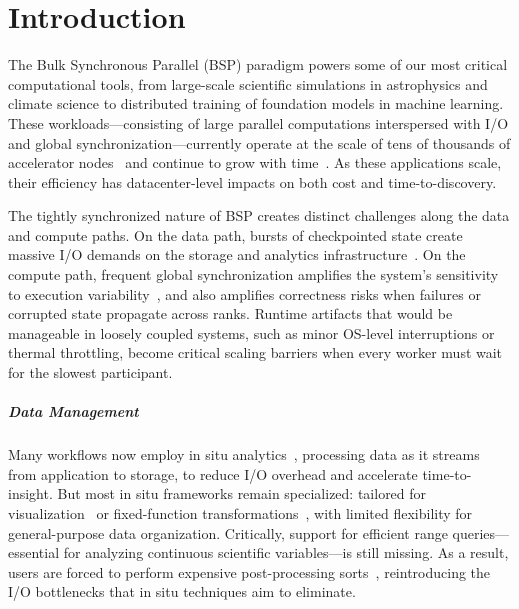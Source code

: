 
\chapter{Introduction}
\minitoc

The Bulk Synchronous Parallel (BSP) paradigm powers some of our most critical computational tools,
from large-scale scientific simulations in astrophysics and climate science to distributed training
of foundation models in machine learning.
These workloads---consisting of large parallel computations interspersed with I/O and global
synchronization---currently operate at the scale of tens of thousands of accelerator
nodes~\cite{Das2023:LargeScale,Stock2024:LargeScale,Gratt2024:Llama3Scale,:LlamaScale} and
continue to grow with time~\cite{Rahma2024:MLScale}.
As these applications scale, their efficiency has datacenter-level impacts on both cost and
time-to-discovery.

The tightly synchronized nature of BSP creates distinct challenges along the data and compute
paths.
On the data path, bursts of checkpointed state create massive I/O demands on the storage and
analytics
infrastructure~\cite{Jones2012:Checkpointing,Eisen2022:Checkpoint,Lian2025:UniversalCheckpointing}.
On the compute path, frequent global synchronization amplifies the system's sensitivity to
execution
variability~\cite{Hoefl2010:Noise,Petri2003:Missing,Yildi2016:IONoise,Kocol2018:Varbench,Acun2016:Variation},
and also amplifies correctness risks when failures or corrupted state propagate across ranks.
Runtime artifacts that would be manageable in loosely coupled systems, such as minor OS-level
interruptions or thermal throttling, become critical scaling barriers when every worker must wait
for the slowest participant.

\paragraph{Data Management}
Many workflows now employ in situ
analytics~\cite{Bauer2016:SituMethodsInfrastructures,Child2020:TerminologySituVisualization},
processing data as it streams from application to storage, to reduce I/O overhead and accelerate
time-to-insight.
But most in situ frameworks remain specialized: tailored for
visualization~\cite{Larse2022:Ascent,Ayach2015:Catalyst,Ibrah2019:InteractiveSituVisualization,Gross2021:LightweightInterfaceSitu,Larse2017:ALPINE}
or fixed-function transformations~\cite{Eisen2024:ADIOS}, with limited flexibility for
general-purpose data organization.
Critically, support for efficient range queries---essential for analyzing continuous scientific
variables---is still missing.
As a result, users are forced to perform expensive post-processing
sorts~\cite{Dong2016,Sunda2013:HykSort,Rasmu2011:TritonSort}, reintroducing the I/O bottlenecks
that in situ techniques aim to eliminate.

